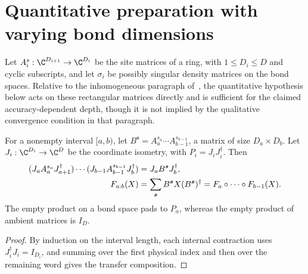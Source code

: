 \section{Quantitative preparation with varying bond dimensions}
\label{sec:ldp_rectangular}

Let $A_i^s:\C^{D_{i+1}}\to\C^{D_i}$ be the site matrices of a ring,
with $1\le D_i\le D$ and cyclic subscripts, and let $\sigma_i$ be
possibly singular density matrices on the bond spaces. Relative to the
inhomogeneous paragraph of~\cite{Malz2024Preparation}, the quantitative
hypothesis below acts on these rectangular matrices directly and is
sufficient for the claimed accuracy-dependent depth, though it is not
implied by the qualitative convergence condition in that paragraph.

\begin{lemma}
    \label{thm:ldp_rectangular_blocking}
    \leanok
    For a nonempty interval $[a,b)$, let
    $B^{\boldsymbol s}=A_a^{s_a}\cdots A_{b-1}^{s_{b-1}}$,
    a matrix of size $D_a\times D_b$. Let $J_i:\C^{D_i}\to\C^D$
    be the coordinate isometry, with $P_i=J_iJ_i^\dagger$.
    Then
    \begin{align}
        (J_aA_a^{s_a}J_{a+1}^\dagger)\cdots
        (J_{b-1}A_{b-1}^{s_{b-1}}J_b^\dagger)
         & =J_aB^{\boldsymbol s}J_b^\dagger,\notag \\
        F_{a:b}(X)
         & =\sum_{\boldsymbol s}B^{\boldsymbol s}X
        (B^{\boldsymbol s})^\dagger
        =F_a\circ\cdots\circ F_{b-1}(X).
    \end{align}
    The empty product on a bond space pads to $P_a$, whereas the
    empty product of ambient matrices is $I_D$.
\end{lemma}
\begin{proof}\leanok
    By induction on the interval length, each internal contraction uses
    $J_i^\dagger J_i=I_{D_i}$, and summing over the first physical index and
    then over the remaining word gives the transfer composition.
\end{proof}

